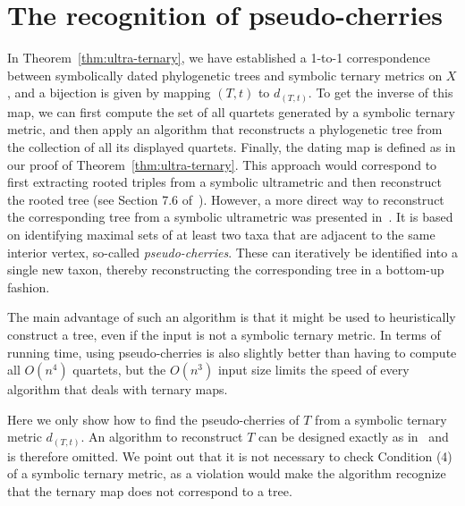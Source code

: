 \documentclass{article}
\begin{document}
\section{The recognition of pseudo-cherries}
\label{sect:pseudo-cherries}
In Theorem~\ref{thm:ultra-ternary}, we have established a 1-to-1 correspondence 
between symbolically dated phylogenetic trees and symbolic ternary metrics on $X$, and 
a bijection is given by mapping $(T,t)$ to $d_{(T,t)}$. To get the inverse of this map, we can 
first compute the set of all quartets generated by a symbolic ternary metric, and then 
apply an algorithm that reconstructs a phylogenetic tree from the collection of all its displayed 
quartets. Finally, the dating map is defined as in our proof of Theorem~\ref{thm:ultra-ternary}. 
This approach would correspond to first extracting rooted triples from a symbolic ultrametric 
and then reconstruct the rooted tree (see Section 7.6 of~\cite{Semple2003}). However, a 
more direct way to reconstruct the corresponding tree from a symbolic ultrametric was presented 
in~\cite{Hellmuth2013}. It is based on identifying maximal sets of at least two taxa that are 
adjacent to the same interior vertex, so-called {\em pseudo-cherries}. These can iteratively 
be identified into a single new taxon, thereby reconstructing the corresponding tree in a bottom-up fashion. 


The main advantage of such an algorithm is that it might be used to heuristically  construct a tree, even 
if the input is not a symbolic ternary metric. In terms of running time, using pseudo-cherries is also 
slightly better than having to compute all $O(n^4)$ quartets, but the $O(n^3)$ input size limits the speed 
of every algorithm that deals with ternary maps. 

% 

Here we only show how to find the pseudo-cherries of $T$ from a symbolic ternary metric 
$d_{(T,t)}$. An algorithm to reconstruct $T$ can be designed exactly as in~\cite{Hellmuth2013} and is 
therefore omitted. 
We point out that it is not necessary to check Condition (4) of a symbolic ternary metric, as a violation would 
make the algorithm recognize that the ternary map does not correspond to a tree. 
\end{document}
